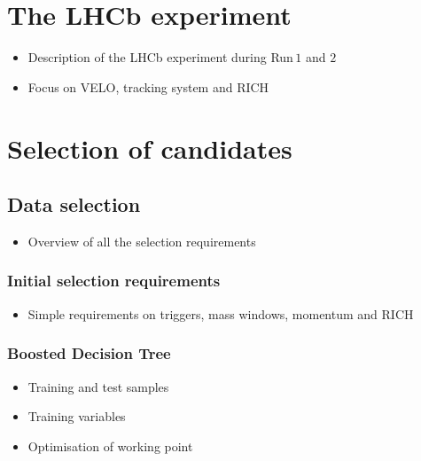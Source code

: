 \documentclass[12pt, a4paper, notitlepage, onecolumn]{article}
\begin{document}
\section{The LHCb experiment}
\label{section_The_LHCb_experiment}
  \begin{itemize}[nosep]
    \setlength{\itemindent}{0em}
    \item{Description of the LHCb experiment during Run\,$1$ and $2$}
    \item{Focus on VELO, tracking system and RICH}
  \end{itemize}

\section{Selection of \texorpdfstring{}{B2DhD2KKpipi} candidates}
\label{section_Selection_of_B2Dh_D2KKpipi_candidates}
\subsection{Data selection}
  \begin{itemize}[nosep]
    \setlength{\itemindent}{2em}
    \item[\textendash]{Overview of all the selection requirements}
  \end{itemize}
\subsubsection{Initial selection requirements}
  \begin{itemize}[nosep]
    \setlength{\itemindent}{2.5em}
    \item[\textasteriskcentered]{Simple requirements on triggers, mass windows, momentum and RICH}
  \end{itemize}
\subsubsection{Boosted Decision Tree}
  \begin{itemize}[nosep]
    \setlength{\itemindent}{2.5em}
    \item[\textasteriskcentered]{Training and test samples}
    \item[\textasteriskcentered]{Training variables}
    \item[\textasteriskcentered]{Optimisation of working point}
  \end{itemize}
\end{document}
